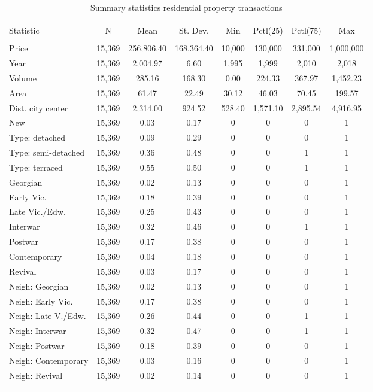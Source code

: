 
\begin{table}[!htbp] \centering 
  \caption{Summary statistics residential property transactions} 
  \label{} 
\begin{tabular}{@{\extracolsep{5pt}}lccccccc} 
\\[-1.8ex]\hline 
\hline \\[-1.8ex] 
Statistic & \multicolumn{1}{c}{N} & \multicolumn{1}{c}{Mean} & \multicolumn{1}{c}{St. Dev.} & \multicolumn{1}{c}{Min} & \multicolumn{1}{c}{Pctl(25)} & \multicolumn{1}{c}{Pctl(75)} & \multicolumn{1}{c}{Max} \\ 
\hline \\[-1.8ex] 
Price & 15,369 & 256,806.40 & 168,364.40 & 10,000 & 130,000 & 331,000 & 1,000,000 \\ 
Year & 15,369 & 2,004.97 & 6.60 & 1,995 & 1,999 & 2,010 & 2,018 \\ 
Volume & 15,369 & 285.16 & 168.30 & 0.00 & 224.33 & 367.97 & 1,452.23 \\ 
Area & 15,369 & 61.47 & 22.49 & 30.12 & 46.03 & 70.45 & 199.57 \\ 
Dist. city center & 15,369 & 2,314.00 & 924.52 & 528.40 & 1,571.10 & 2,895.54 & 4,916.95 \\ 
New & 15,369 & 0.03 & 0.17 & 0 & 0 & 0 & 1 \\ 
Type: detached & 15,369 & 0.09 & 0.29 & 0 & 0 & 0 & 1 \\ 
Type: semi-detached & 15,369 & 0.36 & 0.48 & 0 & 0 & 1 & 1 \\ 
Type: terraced & 15,369 & 0.55 & 0.50 & 0 & 0 & 1 & 1 \\ 
Georgian & 15,369 & 0.02 & 0.13 & 0 & 0 & 0 & 1 \\ 
Early Vic. & 15,369 & 0.18 & 0.39 & 0 & 0 & 0 & 1 \\ 
Late Vic./Edw. & 15,369 & 0.25 & 0.43 & 0 & 0 & 0 & 1 \\ 
Interwar & 15,369 & 0.32 & 0.46 & 0 & 0 & 1 & 1 \\ 
Postwar & 15,369 & 0.17 & 0.38 & 0 & 0 & 0 & 1 \\ 
Contemporary & 15,369 & 0.04 & 0.18 & 0 & 0 & 0 & 1 \\ 
Revival & 15,369 & 0.03 & 0.17 & 0 & 0 & 0 & 1 \\ 
Neigh: Georgian & 15,369 & 0.02 & 0.13 & 0 & 0 & 0 & 1 \\ 
Neigh: Early Vic. & 15,369 & 0.17 & 0.38 & 0 & 0 & 0 & 1 \\ 
Neigh: Late V./Edw. & 15,369 & 0.26 & 0.44 & 0 & 0 & 1 & 1 \\ 
Neigh: Interwar & 15,369 & 0.32 & 0.47 & 0 & 0 & 1 & 1 \\ 
Neigh: Postwar & 15,369 & 0.18 & 0.39 & 0 & 0 & 0 & 1 \\ 
Neigh: Contemporary & 15,369 & 0.03 & 0.16 & 0 & 0 & 0 & 1 \\ 
Neigh: Revival & 15,369 & 0.02 & 0.14 & 0 & 0 & 0 & 1 \\ 
\hline \\[-1.8ex] 
\end{tabular} 
\end{table} 
